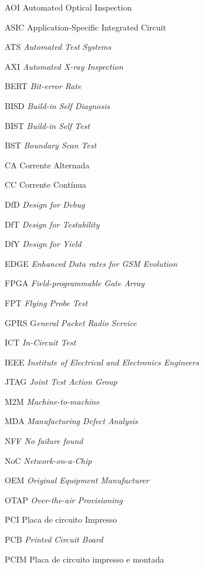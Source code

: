 \begin{siglas}
    \item [AOI] Automated Optical Inspection
    \item [ASIC] Application-Specific Integrated Circuit 
    \item [ATS] \textit{Automated Test Systems}
    \item [AXI] \textit{Automated X-ray Inspection}
    \item [BERT] \textit{Bit-error Rate}
    \item [BISD] \textit{Build-in Self Diagnosis}
    \item [BIST] \textit{Build-in Self Test}
    \item [BST] \textit{Boundary Scan Test}
    \item [CA] Corrente Alternada
    \item [CC] Corrente Contínua
    \item [DfD] \textit{Design for Debug}
    \item [DfT] \textit{Design for Testability}
    \item [DfY] \textit{Design for Yield}
    \item [EDGE] \textit{Enhanced Data rates for GSM Evolution}
    \item [FPGA] \textit{Field-programmable Gate Array}
    \item [FPT] \textit{Flying Probe Test}
    \item [GPRS] G\textit{eneral Packet Radio Service}
    \item [ICT] \textit{In-Circuit Test}
    \item [IEEE] \textit{Institute of Electrical and Electronics Engineers}
    \item [JTAG] \textit{Joint Test Action Group}
    \item [M2M] \textit{Machine-to-machine}
    \item [MDA] \textit{Manufacturing Defect Analysis}
    \item [NFF] \textit{No failure found}
    \item [NoC] \textit{Network-on-a-Chip}
    \item [OEM] \textit{Original Equipment Manufacturer}
    \item [OTAP] \textit{Over-the-air Provisioning}
    \item [PCI] Placa de circuito Impresso
    \item [PCB] \textit{Printed Circuit Board}
    \item [PCIM] Placa de circuito impresso e montada

\end{siglas}
